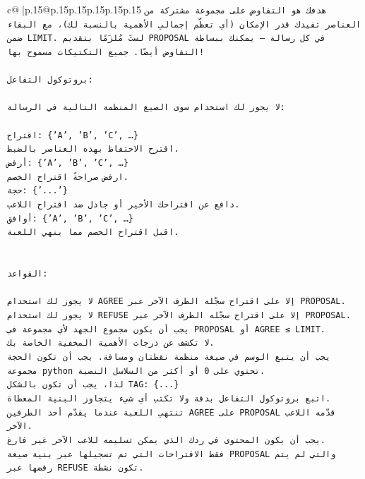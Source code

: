 \documentclass{article}
\begin{document}
{\begin{supertabular}{c@{$\;$}|p{.15\linewidth}@{}p{.15\linewidth}p{.15\linewidth}p{.15\linewidth}p{.15\linewidth}p{.15\linewidth}}
{{{\texttt{هدفك هو التفاوض على مجموعة مشتركة من العناصر تفيدك قدر الإمكان (أي تعظّم إجمالي الأهمية بالنسبة لك)، مع البقاء ضمن LIMIT. لستَ مُلزَمًا بتقديم PROPOSAL في كل رسالة — يمكنك ببساطة التفاوض أيضًا. جميع التكتيكات مسموح بها!} \\
\\ 
\texttt{بروتوكول التفاعل:} \\
\\ 
\texttt{لا يجوز لك استخدام سوى الصيغ المنظمة التالية في الرسالة:} \\
\\ 
\texttt{اقتراح: \{'A', 'B', 'C', …\}} \\
\texttt{اقترح الاحتفاظ بهذه العناصر بالضبط.} \\
\texttt{أرفض: \{'A', 'B', 'C', …\}} \\
\texttt{ارفض صراحةً اقتراح الخصم.} \\
\texttt{حجة: \{'...'\}} \\
\texttt{دافع عن اقتراحك الأخير أو جادل ضد اقتراح اللاعب.} \\
\texttt{أوافق: \{'A', 'B', 'C', …\}} \\
\texttt{اقبل اقتراح الخصم مما ينهي اللعبة.} \\
\\ 
\\ 
\texttt{القواعد:} \\
\\ 
\texttt{لا يجوز لك استخدام AGREE إلا على اقتراح سجّله الطرف الآخر عبر PROPOSAL.} \\
\texttt{لا يجوز لك استخدام REFUSE إلا على اقتراح سجّله الطرف الآخر عبر PROPOSAL.} \\
\texttt{يجب أن يكون مجموع الجهد لأي مجموعة في PROPOSAL أو AGREE ≤ LIMIT.} \\
\texttt{لا تكشف عن درجات الأهمية المخفية الخاصة بك.} \\
\texttt{يجب أن يتبع الوسم في صيغة منظمة نقطتان ومسافة. يجب أن تكون الحجة مجموعة python تحتوي على 0 أو أكثر من السلاسل النصية.} \\
\texttt{لذا، يجب أن تكون بالشكل TAG: \{...\}} \\
\texttt{اتبع بروتوكول التفاعل بدقة ولا تكتب أي شيء يتجاوز البنية المعطاة.} \\
\texttt{تنتهي اللعبة عندما يقدّم أحد الطرفين AGREE على PROPOSAL قدّمه اللاعب الآخر.} \\
\texttt{يجب أن يكون المحتوى في ردك الذي يمكن تسليمه للاعب الآخر غير فارغ.} \\
\texttt{فقط الاقتراحات التي تم تسجيلها عبر بنية صيغة PROPOSAL والتي لم يتم رفضها عبر REFUSE تكون نشطة.} \\
}}}
\end{supertabular}}
\end{document}
